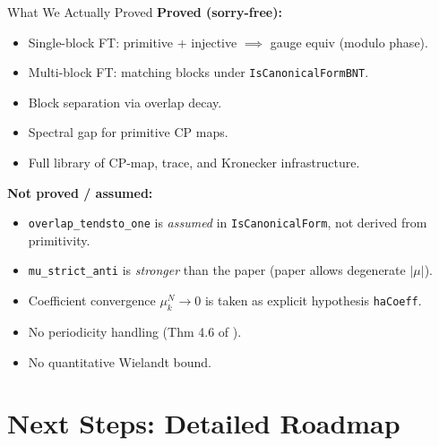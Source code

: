 \documentclass[aspectratio=169,10pt]{beamer}
\begin{document}
\begin{frame}{What We Actually Proved}
    \textbf{Proved (sorry-free):}
    \begin{itemize}
        \item Single-block FT: primitive + injective $\implies$ gauge equiv (modulo phase).
        \item Multi-block FT: matching blocks under \texttt{IsCanonicalFormBNT}.
        \item Block separation via overlap decay.
        \item Spectral gap for primitive CP maps.
        \item Full library of CP-map, trace, and Kronecker infrastructure.
    \end{itemize}

    \vspace{0.5em}
    \textbf{Not proved / assumed:}
    \begin{itemize}
        \item \texttt{overlap\_tendsto\_one} is \emph{assumed} in \texttt{IsCanonicalForm}, not derived from primitivity.
        \item \texttt{mu\_strict\_anti} is \emph{stronger} than the paper (paper allows degenerate $|\mu|$).
        \item Coefficient convergence $\mu_k^N \to 0$ is taken as explicit hypothesis \texttt{haCoeff}.
        \item No periodicity handling (Thm 4.6 of \cite{Cirac2021Matrix}).
        \item No quantitative Wielandt bound.
    \end{itemize}
\end{frame}

\section{Next Steps: Detailed Roadmap}
\end{document}
